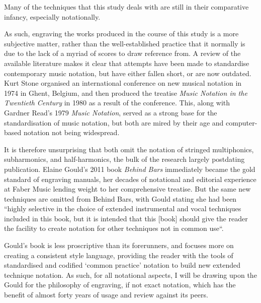 Many of the techniques that this study deals with are still in their comparative infancy, especially notationally.

As such, engraving the works produced in the course of this study is a more subjective matter, rather than the well-established practice that it normally is due to the lack of a myriad of scores to draw reference from. 
A review of the available literature makes it clear that attempts have been made to standardise contemporary music notation, but have either fallen short, or are now outdated. 
Kurt Stone organised an international conference on new musical notation in 1974 in Ghent, Belgium, and then produced the treatise \emph{Music Notation in the Twentieth Century} in 1980 as a result of the conference.\autocite[xiii]{stoneMusicNotationTwentieth1980} 
This, along with Gardner Read’s 1979 \emph{Music Notation}, served as a strong base for the standardisation of music notation, but both are mired by their age and computer-based notation not being widespread.\autocite{readMusicNotationManual1979} 

It is therefore unsurprising that both omit the notation of stringed multiphonics, subharmonics, and half-harmonics, the bulk of the research largely postdating publication. 
Elaine Gould’s 2011 book \emph{Behind Bars} immediately became the gold standard of engraving manuals, her decades of notational and editorial experience at Faber Music lending weight to her comprehensive treatise.\autocite[]{gouldBars2011} 
But the same new techniques are omitted from Behind Bars, with Gould stating she had been ``highly selective in the choice of extended instrumental and vocal techniques included in this book, but it is intended that this [book] should give the reader the facility to create notation for other techniques not in common use``.\autocite[iii]{gouldBars2011} 

Gould’s book is less proscriptive than its forerunners, and focuses more on creating a consistent style language, providing the reader with the tools of standardised and codified ‘common practice’ notation to build new extended technique notation. 
As such, for all notational aspects, I will be drawing upon the Gould for the philosophy of engraving, if not exact notation, which has the benefit of almost forty years of usage and review against its peers.

